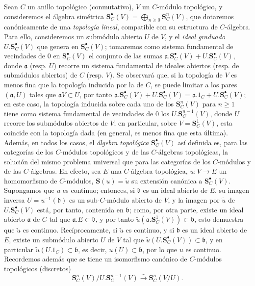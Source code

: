\begin{env}[19.5.1]
\label{0.19.5.1-fr}

Sean $C$ un anillo topológico (conmutativo), $V$ un $C$-módulo topológico,
y consideremos el álgebra simétrica
$\mathbf S_C^\bullet(V)=\bigoplus_{n\geq0}\mathbf S_C^n(V)$, que dotaremos
canónicamente de una \emph{topología lineal}, compatible con su estructura de
$C$-álgebra. Para ello, consideremos un submódulo abierto $U$ de $V$, y
el \emph{ideal graduado} $U.\mathbf S_C^\bullet(V)$ que genera en
$\mathbf S_C^\bullet(V)$; tomaremos como sistema fundamental de vecindades de
$0$ en $\mathbf S_C^\bullet(V)$ el conjunto de las sumas
$\mathfrak a.\mathbf S_C^\bullet(V)+U.\mathbf S_C^\bullet(V)$, donde $\mathfrak a$ (resp.
$U$) recorre un sistema fundamental de ideales abiertos (resp. de submódulos
abiertos) de $C$ (resp. $V$). Se observará que, si la topología de $V$ es menos
fina que la topología inducida por la de $C$, se puede limitar a los pares
$(\mathfrak a,U)$ tales que $\mathfrak aV\subset U$, por tanto
$\mathfrak a.\mathbf S_C^\bullet(V)+U.\mathbf S_C^\bullet(V)
=\mathfrak a.1_C+U.\mathbf S_C^\bullet(V)$; en este caso, la topología inducida sobre
cada uno de los $\mathbf S_C^n(V)$ para $n\geq1$ tiene como sistema fundamental de
vecindades de $0$ los $U.\mathbf S_C^{n-1}(V)$, donde $U$ recorre los
submódulos abiertos de $V$; en particular, sobre $V=\mathbf S_C^1(V)$, esta
coincide con la topología dada (en general, es menos fina que esta
última). Además, en todos los casos, el \emph{álgebra topológica}
$\mathbf S_C^\bullet(V)$ así definida es, para las categorías de los $C$-módulos
topológicos y de las $C$-álgebras topológicas, la solución del mismo problema
universal que para las categorías de los $C$-módulos y de las $C$-álgebras. En efecto,
sea $E$ una $C$-álgebra topológica, $u:V\to E$ un homomorfismo de
$C$-módulos, $\mathbf S(u)=\widetilde u$ su extensión canónica a
$\mathbf S_C^\bullet(V)$. Supongamos que $u$ es continuo; entonces, si $\mathfrak b$ es un
ideal abierto de $E$, su imagen inversa $U=u^{-1}(\mathfrak b)$ es un
sub-$C$-módulo abierto de $V$, y la imagen por $\widetilde u$ de
$U.\mathbf S_C^\bullet(V)$ está, por tanto, contenida en $\mathfrak b$; como, por otra parte,
existe un ideal abierto $\mathfrak a$ de $C$ tal que
$\mathfrak a.E\subset\mathfrak b$, y por tanto
$\widetilde u(\mathfrak a.\mathbf S_C^1(V))\subset\mathfrak b$, esto demuestra
que $\widetilde u$ es continuo. Recíprocamente, si $\widetilde u$ es continuo,
y si $\mathfrak b$ es un ideal abierto de $E$, existe un submódulo abierto
$U$ de $V$ tal que $\widetilde u(U.\mathbf S_C^\bullet(V))\subset\mathfrak b$, y en
particular $\widetilde u(U.1_C)\subset\mathfrak b$, es decir,
$u(U)\subset\mathfrak b$, por lo que $u$ es continuo. Recordemos además que se tiene
un isomorfismo canónico de $C$-módulos topológicos (discretos)
\begin{equation}
\label{0.19.5.1.1-fr}
  \mathbf S_C^n(V)/U.\mathbf S_C^{n-1}(V)
  \xrightarrow{\sim}\mathbf S_C^n(V/U).
  \tag{19.5.1.1}
\end{equation}
\end{env}

